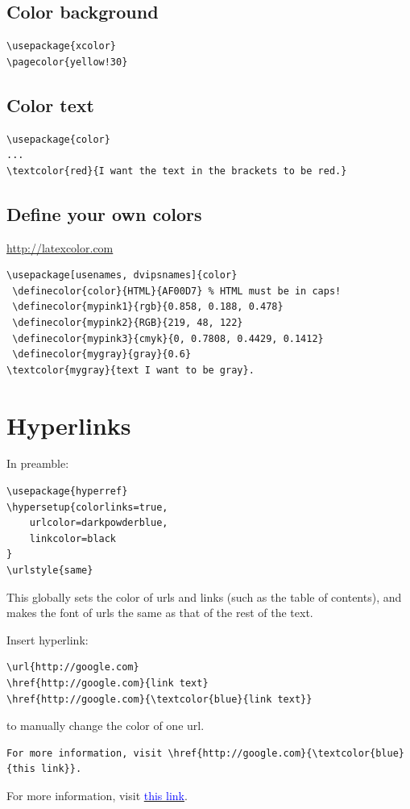 \documentclass{article}
\begin{document}
\subsection{Color background }
\begin{verbatim}
\usepackage{xcolor}
\pagecolor{yellow!30}
\end{verbatim}

\subsection{Color text}
\begin{verbatim}
\usepackage{color}
...
\textcolor{red}{I want the text in the brackets to be red.}
\end{verbatim}

\subsection{Define your own colors}\label{ssec:definecolors}
\url{http://latexcolor.com}
\begin{verbatim}
\usepackage[usenames, dvipsnames]{color}
 \definecolor{color}{HTML}{AF00D7} % HTML must be in caps!
 \definecolor{mypink1}{rgb}{0.858, 0.188, 0.478}
 \definecolor{mypink2}{RGB}{219, 48, 122}
 \definecolor{mypink3}{cmyk}{0, 0.7808, 0.4429, 0.1412}
 \definecolor{mygray}{gray}{0.6}
\textcolor{mygray}{text I want to be gray}.
\end{verbatim}

\section{Hyperlinks}

In preamble:
\begin{verbatim}
\usepackage{hyperref}
\hypersetup{colorlinks=true,
    urlcolor=darkpowderblue,
    linkcolor=black
}
\urlstyle{same}
\end{verbatim}
This globally sets the color of urls and links (such as the table of contents),
and makes the font of urls the same as that of the rest of the text.

Insert hyperlink:
\begin{verbatim}
\url{http://google.com}
\href{http://google.com}{link text}
\href{http://google.com}{\textcolor{blue}{link text}}
\end{verbatim}
to manually change the color of one url.

\begin{verbatim}
For more information, visit \href{http://google.com}{\textcolor{blue}{this link}}.
\end{verbatim}
For more information, visit \href{http://google.com}
{\textcolor{blue}{this link}}.
\end{document}
